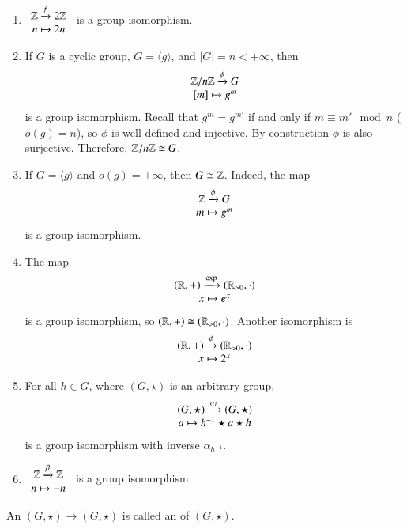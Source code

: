 \documentclass[12pt, a4paper, oneside, openright, titlepage]{book}
\begin{document}
\begin{eg}
    \leavevmode
    \begin{enumerate}
        \item $\begin{array}{c} \mathbb Z\xrightarrow{f}2\mathbb Z \\ n\mapsto 2n \end{array}$ is a group isomorphism.
        \item If $G$ is a cyclic group, $G = \langle g \rangle$, and $|G| = n <+\infty$, then \begin{equation}
            \begin{array}{c} \mathbb Z/n\mathbb Z\xrightarrow{\phi}G \\ {[m]}\mapsto g^m \end{array}
        \end{equation}
        is a group isomorphism. Recall that $g^m = g^{m'}$ if and only if $m\equiv m' \mod n$ ($o(g) = n$), so $\phi$ is well-defined and injective. By construction $\phi$ is also surjective. Therefore, $\mathbb Z/n\mathbb Z \cong G$.
        \item If $G = \langle g \rangle$ and $o(g) = +\infty$, then $G \cong \mathbb Z$. Indeed, the map \begin{equation}
            \begin{array}{c} \mathbb Z\xrightarrow{\phi} G \\ m\mapsto g^m \end{array}
        \end{equation}
        is a group isomorphism.
        \item The map \begin{equation}
            \begin{array}{c} (\mathbb R,+)\xrightarrow{\exp}(\mathbb R_{>0},\cdot) \\ x\mapsto e^x \end{array}
        \end{equation}
        is a group isomorphism, so $(\mathbb R,+)\cong (\mathbb R_{>0},\cdot)$. Another isomorphism is \begin{equation}
            \begin{array}{c} (\mathbb R,+)\xrightarrow{\phi}(\mathbb R_{>0},\cdot) \\ x\mapsto 2^x \end{array}
        \end{equation}
        \item For all $h \in G$, where $(G,\star)$ is an arbitrary group, \begin{equation*}
            \begin{array}{c} (G,\star) \xrightarrow{\alpha_h}(G,\star) \\ a \mapsto h^{-1}\star a \star h \end{array}
        \end{equation*}
        is a group isomorphism with inverse $\alpha_{h^{-1}}$.
        \item $\begin{array}{c} \mathbb Z\xrightarrow{\beta}\mathbb Z \\ n\mapsto -n \end{array}$ is a group isomorphism.
    \end{enumerate}
\end{eg}

\begin{defn}
    An  $(G,\star)\rightarrow(G,\star)$ is called an  of $(G,\star)$.
\end{defn}
\end{document}
